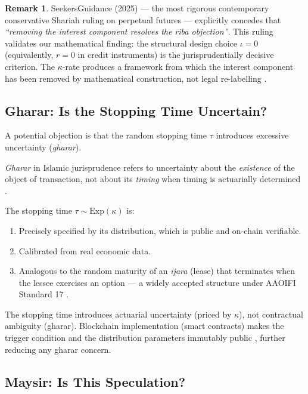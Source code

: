 \documentclass[10pt,twocolumn]{article}
\theoremstyle{plain}
\theoremstyle{definition}
\newtheorem{remark}{Remark}
\begin{document}
\begin{remark}
SeekersGuidance (2025) --- the most rigorous contemporary
conservative Shariah ruling on perpetual futures --- explicitly
concedes that \textit{``removing the interest component resolves
the riba objection''}. This ruling validates our mathematical
finding: the structural design choice $\iota = 0$ (equivalently,
$r = 0$ in credit instruments) is the jurisprudentially decisive
criterion. The $\kappa$-rate produces a framework from which
the interest component has been removed by mathematical
construction, not legal re-labelling \cite{SeekersGuidance2025}.
\end{remark}

\subsection{Gharar: Is the Stopping Time Uncertain?}

A potential objection is that the random stopping time $\tau$
introduces excessive uncertainty (\textit{gharar}).

\textit{Gharar} in Islamic jurisprudence refers to uncertainty
about the \textit{existence} of the object of transaction, not
about its \textit{timing} when timing is actuarially determined
\cite{ElGamal2006,Kamali2007}.

The stopping time $\tau \sim \mathrm{Exp}(\kappa)$ is:
\begin{enumerate}[leftmargin=*,noitemsep]
\item Precisely specified by its distribution, which is public
and on-chain verifiable.
\item Calibrated from real economic data.
\item Analogous to the random maturity of an \textit{ijara}
(lease) that terminates when the lessee exercises an option ---
a widely accepted structure under AAOIFI Standard 17
\cite{AAOIFI2017,AdamThomas2004}.
\end{enumerate}
The stopping time introduces actuarial uncertainty (priced by
$\kappa$), not contractual ambiguity (gharar). Blockchain
implementation (smart contracts) makes the trigger condition
and the distribution parameters immutably public
\cite{TokenizedSukuk2022}, further reducing any gharar concern.

\subsection{Maysir: Is This Speculation?}
\end{document}
